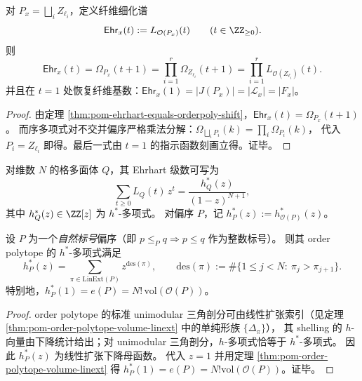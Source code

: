 \begin{corollary}\label{cor:pom-fiber-ehrhart-product}
对 \(P_x=\bigsqcup_i Z_{\ell_i}\)，定义纤维细化谱
\[
\mathsf{Ehr}_x(t):=L_{\mathcal O(P_x)}(t)\qquad(t\in\ZZ_{\ge 0}).
\]
则
\[
\mathsf{Ehr}_x(t)=\Omega_{P_x}(t+1)=\prod_{i=1}^r \Omega_{Z_{\ell_i}}(t+1)
=\prod_{i=1}^r L_{\mathcal O(Z_{\ell_i})}(t).
\]
并且在 \(t=1\) 处恢复纤维基数：\(\mathsf{Ehr}_x(1)=|J(P_x)|=|\mathcal L_x|=|F_x|\)。
\end{corollary}
\begin{proof}
由定理 \ref{thm:pom-ehrhart-equals-orderpoly-shift}，\(\mathsf{Ehr}_x(t)=\Omega_{P_x}(t+1)\)。
而序多项式对不交并偏序严格乘法分解：\(\Omega_{\bigsqcup_i P_i}(k)=\prod_i\Omega_{P_i}(k)\)，
代入 \(P_i=Z_{\ell_i}\) 即得。最后一式由 \(t=1\) 的指示函数刻画立得。证毕。
\end{proof}

\begin{definition}\label{def:pom-hstar-order-polytope}
对维数 \(N\) 的格多面体 \(Q\)，其 Ehrhart 级数可写为
\[
\sum_{t\ge 0} L_Q(t)\,z^t=\frac{h_Q^*(z)}{(1-z)^{N+1}},
\]
其中 \(h_Q^*(z)\in\ZZ[z]\) 为 \(h^*\)-多项式。
对偏序 \(P\)，记 \(h_P^*(z):=h_{\mathcal O(P)}^*(z)\)。
\end{definition}

\begin{theorem}\label{thm:pom-hstar-descent-linext}
设 \(P\) 为一个\emph{自然标号}偏序（即 \(p\le_P q \Rightarrow p\le q\) 作为整数标号）。
则其 order polytope 的 \(h^*\)-多项式满足
\[
h_P^*(z)=\sum_{\pi\in\mathrm{LinExt}(P)} z^{\mathrm{des}(\pi)},
\qquad
\mathrm{des}(\pi):=\#\{1\le j<N:\ \pi_j>\pi_{j+1}\}.
\]
特别地，\(h_P^*(1)=e(P)=N!\,\mathrm{vol}(\mathcal O(P))\)。
\end{theorem}
\begin{proof}
order polytope 的标准 unimodular 三角剖分可由线性扩张索引（见定理 \ref{thm:pom-order-polytope-volume-linext} 中的单纯形族 \(\{\Delta_\pi\}\)），
其 shelling 的 \(h\)-向量由下降统计给出；对 unimodular 三角剖分，\(h\)-多项式恰等于 \(h^*\)-多项式。
因此 \(h_P^*(z)\) 为线性扩张下降母函数。
代入 \(z=1\) 并用定理 \ref{thm:pom-order-polytope-volume-linext} 得 \(h_P^*(1)=e(P)=N!\mathrm{vol}(\mathcal O(P))\)。证毕。
\end{proof}

